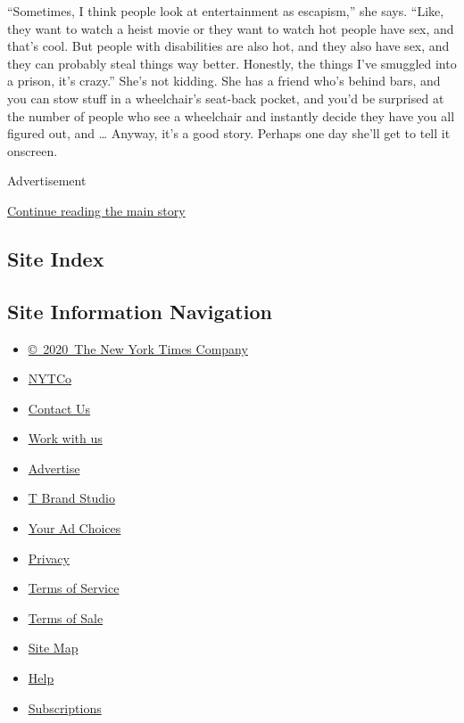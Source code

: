 ``Sometimes, I think people look at entertainment as escapism,'' she
says. ``Like, they want to watch a heist movie or they want to watch hot
people have sex, and that's cool. But people with disabilities are also
hot, and they also have sex, and they can probably steal things way
better. Honestly, the things I've smuggled into a prison, it's crazy.''
She's not kidding. She has a friend who's behind bars, and you can stow
stuff in a wheelchair's seat-back pocket, and you'd be surprised at the
number of people who see a wheelchair and instantly decide they have you
all figured out, and \ldots{} Anyway, it's a good story. Perhaps one day
she'll get to tell it onscreen.

Advertisement

\protect\hyperlink{after-bottom}{Continue reading the main story}

\hypertarget{site-index}{%
\subsection{Site Index}\label{site-index}}

\hypertarget{site-information-navigation}{%
\subsection{Site Information
Navigation}\label{site-information-navigation}}

\begin{itemize}
\tightlist
\item
  \href{https://help.nytimes3xbfgragh.onion/hc/en-us/articles/115014792127-Copyright-notice}{©~2020~The
  New York Times Company}
\end{itemize}

\begin{itemize}
\tightlist
\item
  \href{https://www.nytco.com/}{NYTCo}
\item
  \href{https://help.nytimes3xbfgragh.onion/hc/en-us/articles/115015385887-Contact-Us}{Contact
  Us}
\item
  \href{https://www.nytco.com/careers/}{Work with us}
\item
  \href{https://nytmediakit.com/}{Advertise}
\item
  \href{http://www.tbrandstudio.com/}{T Brand Studio}
\item
  \href{https://www.nytimes3xbfgragh.onion/privacy/cookie-policy\#how-do-i-manage-trackers}{Your
  Ad Choices}
\item
  \href{https://www.nytimes3xbfgragh.onion/privacy}{Privacy}
\item
  \href{https://help.nytimes3xbfgragh.onion/hc/en-us/articles/115014893428-Terms-of-service}{Terms
  of Service}
\item
  \href{https://help.nytimes3xbfgragh.onion/hc/en-us/articles/115014893968-Terms-of-sale}{Terms
  of Sale}
\item
  \href{https://spiderbites.nytimes3xbfgragh.onion}{Site Map}
\item
  \href{https://help.nytimes3xbfgragh.onion/hc/en-us}{Help}
\item
  \href{https://www.nytimes3xbfgragh.onion/subscription?campaignId=37WXW}{Subscriptions}
\end{itemize}
